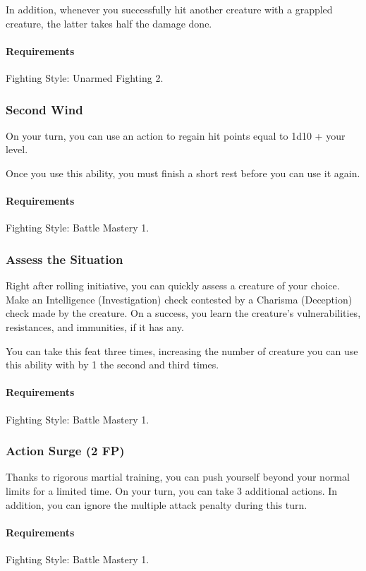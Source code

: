     In addition, whenever you successfully hit another creature with a grappled creature, the latter takes half the damage done.
    \paragraph{Requirements} Fighting Style: Unarmed Fighting 2.
\subsubsection{Second Wind} \label{feat::secondwind}
    On your turn, you can use an action to regain hit points equal to 1d10 + your level.

    Once you use this ability, you must finish a short rest before you can use it again.
    \paragraph{Requirements} Fighting Style: Battle Mastery 1.
\subsubsection{Assess the Situation} \label{feat::assessthesituation}
    Right after rolling initiative, you can quickly assess a creature of your choice.
    Make an Intelligence (Investigation) check contested by a Charisma (Deception) check made by the creature.
    On a success, you learn the creature's vulnerabilities, resistances, and immunities, if it has any.

    You can take this feat three times, increasing the number of creature you can use this ability with by 1 the second and third times.
    \paragraph{Requirements} Fighting Style: Battle Mastery 1.
\subsubsection{Action Surge (2 FP)} \label{feat::actionsurge}
    Thanks to rigorous martial training, you can push yourself beyond your normal limits for a limited time.
    On your turn, you can take 3 additional actions.
    In addition, you can ignore the multiple attack penalty during this turn.
    \paragraph{Requirements} Fighting Style: Battle Mastery 1.
